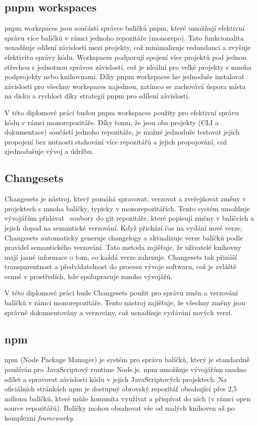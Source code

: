 \subsection{pnpm workspaces}
pnpm workspaces jsou součástí správce balíčků pnpm, které umožňují efektivní správu více balíčků v rámci jednoho repozitáře (monorepo). Tato funkcionalita usnadňuje sdílení závislostí mezi projekty, což minimalizuje redundanci a zvyšuje efektivitu správy kódu. Workspaces podporují spojení více projektů pod jednou střechou s jednotnou správou závislostí, což je ideální pro velké projekty s mnoha podprojekty nebo knihovnami. Díky pnpm workspaces lze jednoduše instalovat závislosti pro všechny workspaces najednou, zatímco se zachovává úspora místa na disku a rychlost díky strategii pnpm pro sdílení závislostí. \cite{PnpmWorkspaces}

V této diplomové práci budou pnpm workspaces použity pro efektivní správu kódu v rámci monorepozitáře. Díky tomu, že jsou oba projekty (CLI a dokumentace) součástí jednoho repozitáře, je možné jednoduše testovat jejich propojení bez nutnosti stahování více repozitářů a jejich propojování, což zjednodušuje vývoj a údržbu.


\subsection{Changesets}
Changesets je nástroj, který pomáhá spravovat, verzovat a zveřejňovat změny v projektech s mnoha balíčky, typicky v monorepozitářích. Tento systém umožňuje vývojářům přidávat ~soubory do git repozitáře, které popisují změny v balíčcích a jejich dopad na semantické verzování. Když přichází čas na vydání nové verze, Changesets automaticky generuje changelogy a aktualizuje verze balíčků podle pravidel semantického verzování. Tato metoda zajišťuje, že uživatelé knihovny mají jasné informace o tom, co každá verze zahrnuje. Changesets tak přináší transparentnost a předvídatelnost do procesu vývoje softwaru, což je zvláště cenné v prostředích, kde spolupracuje mnoho vývojářů. \cite{Changesets}

V této diplomové práci bude Changesets použit pro správu změn a verzování balíčků v rámci monorepozitáře. Tento nástroj zajišťuje, že všechny změny jsou správně dokumentovány a verzovány, což usnadňuje vydávání nových verzí.

\subsection{npm}
npm (Node Package Manager) je systém pro správu balíčků, který je standardně používán pro JavaScriptový runtime Node.js. npm umožňuje vývojářům snadno sdílet a spravovat závislosti kódu v jejich JavaScriptových projektech. Na oficiálních stránkách npm je dostupný obrovský repozitář obsahující přes 2,5 milionu balíčků, které může komunita využívat a přispívat do nich (v rámci open source repozitářů). Balíčky mohou obsahovat vše od malých knihoven až po komplexní \emph{frameworky}. \cite{Npm}

